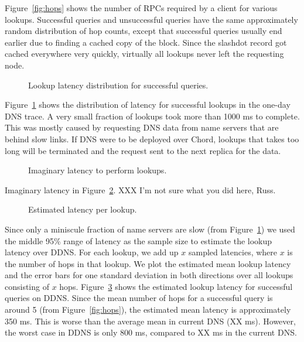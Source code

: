 Figure~\ref{fig:hops} shows the number of RPCs required
by a client for various lookups.
Successful queries and unsuccessful queries have the same
approximately random distribution of hop counts, except
that successful queries usually end earlier due to finding
a cached copy of the block.
Since the slashdot record got cached everywhere very quickly,
virtually all lookups never left the requesting node.

\begin{figure}
\caption{Lookup latency distribution for successful queries.}
\label{fig:oklat}
\end{figure}

Figure~\ref{fig:oklat} shows the distribution of latency
for successful lookups in the one-day DNS trace. A very small
fraction of lookups took more than 1000 ms to complete. 
This was mostly caused by requesting DNS data from name servers
that are behind slow links. If DNS were to be deployed over 
Chord, lookups that takes too long will be terminated and 
the request sent to the next replica for the data.

\begin{figure}
\caption{Imaginary latency to perform lookups.}
\label{fig:imaglat}
\end{figure}

Imaginary latency in Figure~\ref{fig:imaglat}. 
XXX I'm not sure what you did here, Russ.

\begin{figure}
\caption{Estimated latency per lookup.}
\label{fig:hopslat}
\end{figure}

Since only a miniscule fraction of name servers are slow
(from Figure~\ref{fig:oklat}) we used the middle 95\% range
of latency as the sample size to estimate the lookup latency
over DDNS. For each lookup, we add up $x$ sampled latencies,
where $x$ is the number of hops in that lookup. We plot the 
estimated mean lookup latency and the error bars for one 
standard deviation in both directions over all lookups consisting
of $x$ hops. Figure~\ref{fig:hopslat} shows the estimated 
lookup latency for successful queries on DDNS. Since the mean
number of hops for a successful query is around 5 
(from Figure~\ref{fig:hops}), the estimated mean latency 
is approximately 350 ms. This is worse than the average mean in
current DNS (XX ms). However, the worst case in DDNS is only 800 ms,
compared to XX ms in the current DNS.

